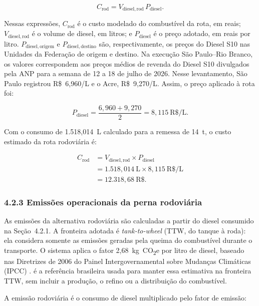 \documentclass[brazil,]{article}
\let\oldsubsubsection\subsubsection
\renewcommand{\subsubsection}{\Needspace{10\baselineskip}\oldsubsubsection}
\newcommand{\keepcalculation}{\Needspace{12\baselineskip}}
\begin{document}
\[
C_{\mathrm{rod}}=V_{\mathrm{diesel,rod}}\,P_{\mathrm{diesel}}.
\]

Nessas expressões, \(C_{\mathrm{rod}}\) é o custo modelado do
combustível da rota, em reais; \(V_{\mathrm{diesel,rod}}\) é o volume de
diesel, em litros; e \(P_{\mathrm{diesel}}\) é o preço adotado, em reais
por litro. \(P_{\mathrm{diesel,origem}}\) e
\(P_{\mathrm{diesel,destino}}\) são, respectivamente, os preços do
Diesel S10 nas Unidades da Federação de origem e destino. Na execução
São Paulo--Rio Branco, os valores correspondem aos preços médios de
revenda do Diesel S10 divulgados pela ANP para a semana de 12 a 18 de
julho de 2026. Nesse levantamento, São Paulo registrou R\$~6,960/L e o
Acre, R\$~9,270/L. Assim, o preço aplicado à rota foi:

\[
P_{\mathrm{diesel}}
=\frac{6{,}960+9{,}270}{2}
=8{,}115\ \text{R\$/L}.
\]

Com o consumo de 1.518,014~L calculado para a remessa de 14~t, o custo
estimado da rota rodoviária é:

\[
\begin{aligned}
C_{\mathrm{rod}}
&=V_{\mathrm{diesel,rod}}\times P_{\mathrm{diesel}}\\
&=1.518{,}014\ \mathrm{L}\times8{,}115\ \text{R\$/L}\\
&=12.318{,}68\ \text{R\$}.
\end{aligned}
\]

\hypertarget{emissuxf5es-operacionais-da-perna-rodoviuxe1ria}{%
\subsubsection{4.2.3 Emissões operacionais da perna
rodoviária}\label{emissuxf5es-operacionais-da-perna-rodoviuxe1ria}}

As emissões da alternativa rodoviária são calculadas a partir do diesel
consumido na Seção~4.2.1. A fronteira adotada é \emph{tank-to-wheel}
(TTW, do tanque à roda): ela considera somente as emissões geradas pela
queima do combustível durante o transporte. O sistema aplica o fator
2,68~kg~CO\textsubscript{2}e por litro de diesel, baseado nas Diretrizes de 2006 do
Painel Intergovernamental sobre Mudanças Climáticas (IPCC)
\parencite{ipcc2006}. \textcite{competitiveness2024} é a referência
brasileira usada para manter essa estimativa na fronteira TTW, sem
incluir a produção, o refino ou a distribuição do combustível.

\keepcalculation
A emissão rodoviária é o consumo de diesel multiplicado pelo fator de
emissão:
\end{document}
